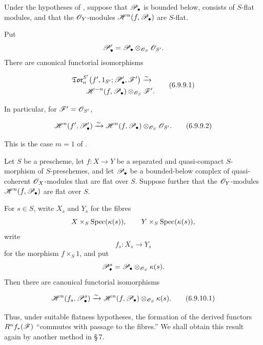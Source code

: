 \begin{corollary}[6.9.9]
\label{III.6.9.9}
Under the hypotheses of , suppose that
$\mathscr{P}_\bullet$ is bounded below, consists of $S$-flat modules,
and that the $\mathscr{O}_Y$-modules
$\mathscr{H}^n(f,\mathscr{P}_\bullet)$ are $S$-flat.


Put
\[
  \mathscr{P}_\bullet'
  =
  \mathscr{P}_\bullet\otimes_{\mathscr{O}_S}\mathscr{O}_{S'}.
\]
There are canonical functorial isomorphisms
\begin{env}[6.9.9.1]
\label{III.6.9.9.1}
\[
\begin{split}
  &
  \mathfrak{Tor}_n^{S'}
  \bigl(
    f',1_{S'};\sh P_\bullet',\sh F'
  \bigr)
  \xrightarrow{\sim}
  \\
  &\qquad
  \sh H^{-n}(f,\sh P_\bullet)
  \otimes_{\sh O_S}\sh F'.
\end{split}
  \tag{6.9.9.1}\label{III.6.9.9.1.eq}
\]
\end{env}
In particular, for $\mathscr{F}'=\mathscr{O}_{S'}$,
\begin{env}[6.9.9.2]
\label{III.6.9.9.2}
\[
  \sh H^n(f',\sh P_\bullet')
  \xrightarrow{\sim}
  \sh H^n(f,\sh P_\bullet)
  \otimes_{\sh O_S}\sh O_{S'}.
  \tag{6.9.9.2}\label{III.6.9.9.2.eq}
\]
\end{env}
This is the case $m=1$ of .
\end{corollary}

\begin{corollary}[6.9.10]
\label{III.6.9.10}
Let $S$ be a prescheme, let $f:X\to Y$ be a separated and
quasi-compact $S$-morphism of $S$-preschemes, and let
$\mathscr{P}_\bullet$ be a bounded-below complex of quasi-coherent
$\mathscr{O}_X$-modules that are flat over $S$.  Suppose further that
the $\mathscr{O}_Y$-modules $\mathscr{H}^n(f,\mathscr{P}_\bullet)$ are flat over
$S$.

For $s\in S$, write $X_s$ and $Y_s$ for the fibres
\[
  X\times_S\operatorname{Spec}(\kappa(s)),
  \qquad
  Y\times_S\operatorname{Spec}(\kappa(s)),
\]
write
\[
  f_s:X_s\longrightarrow Y_s
\]
for the morphism $f\times_S1$, and put
\[
  \mathscr{P}_\bullet^s
  =
  \mathscr{P}_\bullet\otimes_{\mathscr{O}_S}\kappa(s).
\]
Then there are canonical functorial isomorphisms
\begin{env}[6.9.10.1]
\label{III.6.9.10.1}
\[
  \sh H^n(f_s,\sh P_\bullet^s)
  \xrightarrow{\sim}
  \sh H^n(f,\sh P_\bullet)
  \otimes_{\sh O_S}\kres(s).
  \tag{6.9.10.1}\label{III.6.9.10.1.eq}
\]
\end{env}
\end{corollary}

Thus, under suitable flatness hypotheses, the formation of the
derived functors $R^nf_*(\mathscr{F})$ ``commutes with passage to the
fibres.''  We shall obtain this result again by another method in
\S\,7.

